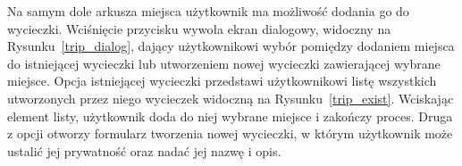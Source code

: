        Na samym dole arkusza miejsca użytkownik ma możliwość dodania go do wycieczki. Wciśnięcie przycisku wywoła ekran dialogowy, widoczny na Rysunku~\ref{trip_dialog}, 
        dający użytkownikowi wybór pomiędzy dodaniem miejsca do istniejącej wycieczki lub utworzeniem nowej wycieczki zawierającej wybrane miejsce. Opcja istniejącej wycieczki
        przedstawi użytkownikowi listę wszystkich utworzonych przez niego wycieczek widoczną na Rysunku~\ref{trip_exist}. Wciskając element listy, użytkownik doda do niej wybrane miejsce 
        i zakończy proces. Druga z opcji otworzy formularz tworzenia nowej wycieczki, w którym użytkownik może ustalić jej prywatność oraz nadać jej nazwę i opis.

        \vspace{1cm}
        \begin{figure}[H]
            \centering
            \begin{subfigure}[b]{0.3\textwidth}
                \centering

\end{subfigure}
\end{figure}
